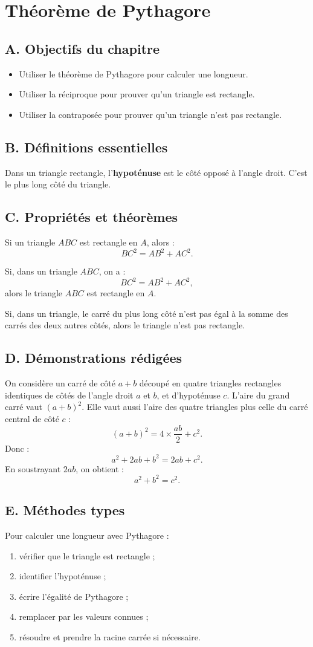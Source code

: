 \documentclass[11pt,a4paper]{article}
\newcommand{\chapitre}[1]{
\clearpage
\section{#1}
}
\newcommand{\objectif}[1]{\subsection*{A. Objectifs du chapitre}#1}
\newcommand{\defs}{\subsection*{B. Définitions essentielles}}
\newcommand{\props}{\subsection*{C. Propriétés et théorèmes}}
\newcommand{\demos}{\subsection*{D. Démonstrations rédigées}}
\newcommand{\methodes}{\subsection*{E. Méthodes types}}
\begin{document}
\chapitre{Théorème de Pythagore}

\objectif{
\begin{itemize}
\item Utiliser le théorème de Pythagore pour calculer une longueur.
\item Utiliser la réciproque pour prouver qu'un triangle est rectangle.
\item Utiliser la contraposée pour prouver qu'un triangle n'est pas rectangle.
\end{itemize}}

\defs
\begin{definitionbox}
Dans un triangle rectangle, l'\textbf{hypoténuse} est le côté opposé à l'angle droit. C'est le plus long côté du triangle.
\end{definitionbox}

\props
\begin{proprietebox}[title=Théorème de Pythagore]
Si un triangle $ABC$ est rectangle en $A$, alors :
\[
BC^2=AB^2+AC^2.
\]
\end{proprietebox}

\begin{proprietebox}[title=Réciproque]
Si, dans un triangle $ABC$, on a :
\[
BC^2=AB^2+AC^2,
\]
alors le triangle $ABC$ est rectangle en $A$.
\end{proprietebox}

\begin{proprietebox}[title=Contraposée]
Si, dans un triangle, le carré du plus long côté n'est pas égal à la somme des carrés des deux autres côtés, alors le triangle n'est pas rectangle.
\end{proprietebox}

\demos
\begin{preuvebox}
On considère un carré de côté $a+b$ découpé en quatre triangles rectangles identiques de côtés de l'angle droit $a$ et $b$, et d'hypoténuse $c$. L'aire du grand carré vaut $(a+b)^2$. Elle vaut aussi l'aire des quatre triangles plus celle du carré central de côté $c$ :
\[
(a+b)^2=4\times\frac{ab}{2}+c^2.
\]
Donc :
\[
a^2+2ab+b^2=2ab+c^2.
\]
En soustrayant $2ab$, on obtient :
\[
a^2+b^2=c^2.
\]
\end{preuvebox}

\methodes
\begin{methodebox}
Pour calculer une longueur avec Pythagore :
\begin{enumerate}
\item vérifier que le triangle est rectangle ;
\item identifier l'hypoténuse ;
\item écrire l'égalité de Pythagore ;
\item remplacer par les valeurs connues ;
\item résoudre et prendre la racine carrée si nécessaire.
\end{enumerate}
\end{methodebox}
\end{document}
